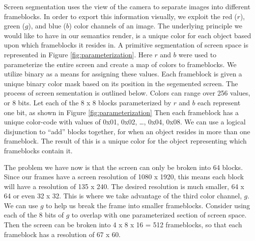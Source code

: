 \documentclass[conference]{IEEEtran}
\begin{document}
Screen segmentation uses the view of the camera to separate images into different
frameblocks.
In order to export this information visually, we exploit the
red ($r$), green ($g$), and blue ($b$) color channels of an image.
The underlying principle we would like to have in our semantics render,
is a unique color for each object based upon which frameblocks it resides in.
A primitive segmentation of screen space is represented in Figure \ref{fig:parameterization}.
Here $r$ and $b$ were used to parameterize the entire screen
and create a map of colors to frameblocks.
We utilize binary as a means for assigning these values.
Each frameblock is given a unique binary color mask based on its position
in the segemented screen.
The process of screen sementation is outlined below.
Colors can range over 256 values, or 8 bits.
Let each of the 8 x 8 blocks parameterized by $r$ and $b$ each represent one bit,
as shown in Figure \ref{fig:parameterization}
Then each frameblock has a unique color-code with values of 0x01, 0x02, \dots, 0x04, 0x08.
We can use a logical disjunction to ``add'' blocks together, for when
an object resides in more than one frameblock.
The result of this is a unique color for the object representing which frameblocks contain it.

The problem we have now is that the screen can only be broken into 64 blocks.
Since our frames have a screen resolution of 1080 x 1920, this means each block will have
a resolution of 135 x 240. The desired resolution is much smaller, 64 x 64
or even 32 x 32.
This is where we take advantage of the third color channel, $g$.
We can use $g$ to help us break the frame into smaller frameblocks.
Consider using each of the 8 bits of $g$ to overlap with one parameterized section of screen space.
Then the screen can be broken into 4 x 8 x 16 = 512 frameblocks,
so that each frameblock has a resolution of 67 x 60.
\end{document}
